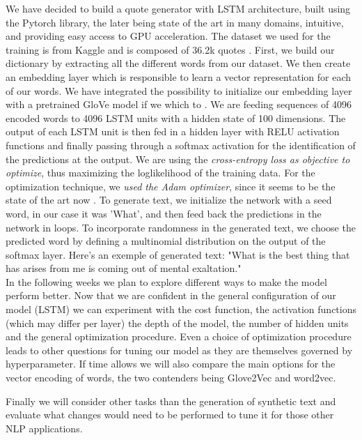 We have decided to build a quote generator with LSTM architecture,
built using the Pytorch library, the later being state of the art in many 
domains, intuitive, and providing easy access to GPU acceleration.  The dataset
we used for the training is from Kaggle and is composed of 36.2k quotes
\cite{quote}. First, we build our dictionary by extracting all the different
words from our dataset. We then create an embedding layer which is responsible
to learn a vector representation for each of our words. We have integrated the
possibility to initialize our embedding layer with a pretrained GloVe model if
we which to \cite{glove}. We are feeding sequences of 4096 encoded words to
4096 LSTM units with a hidden state of 100 dimensions. The output of each LSTM
unit is then fed in a hidden layer with RELU activation functions and finally 
passing through a softmax activation for the identification of the predictions
at the output. We are using the \textit{cross-entropy loss as objective to optimize},
thus maximizing the loglikelihood of the training data. For the optimization
technique, we \textit{used the Adam optimizer}, since it seems to be the state of the
art now \cite{adam}. To generate text, we initialize the network with a seed
word, in our case it was 'What', and then feed back the predictions in the
network in loops. To incorporate randomness in the generated text, we choose
the predicted word by defining a multinomial distribution on the output of the
softmax layer. Here's an exemple of generated text: "What is the best thing
that has arises from me is coming out of mental exaltation." \\

In the following weeks we plan to explore different ways to make the model
perform better. Now that we are confident in the general configuration of our
model (LSTM) we can experiment with the cost function, the activation functions
(which may differ per layer) the depth of the model, the number of hidden units
and the general optimization procedure. Even a choice of optimization procedure
leads to other questions for tuning our model as they are themselves governed
by hyperparameter. If time allows we will also compare the main options for the vector
encoding of words, the two contenders being Glove2Vec and word2vec.
   
Finally we will consider other tasks than the generation of synthetic text
and evaluate what changes would need to be performed to tune it for those
other NLP applications.

\clearpage

 


